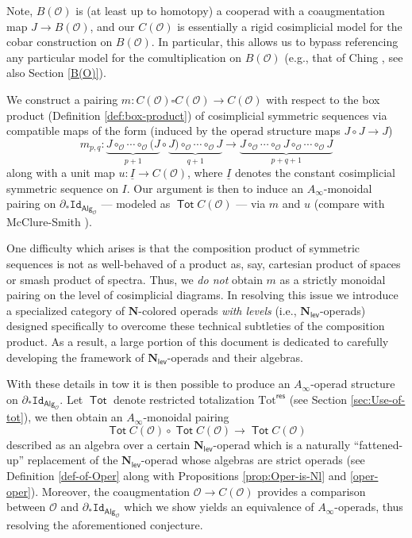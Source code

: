 \documentclass[11pt]{amsart}
\theoremstyle{definition}
\theoremstyle{remark}
\newcommand{\Tot}{\operatorname{\mathsf{Tot}}}
\newcommand{\Alg}[1]{ {\mathsf{Alg}_{\mathcal{#1}}} }
\newcommand{\Id}{\mathtt{Id}}
\newcommand{\Cal}[1]{\mathcal{#1}}
\newcommand{\Nl}{\mathbf{N}_{\mathsf{lev}}}
\begin{document}
Note, $B(\Cal{O})$ is (at least up to homotopy) a cooperad with a coaugmentation map $J\to B(\Cal{O})$, and our $C(\Cal{O})$ is essentially a rigid cosimplicial model for the cobar construction on $B(\Cal{O})$. In particular, this allows us to bypass referencing any particular model for the comultiplication on $B(\Cal{O})$ (e.g.,  that of Ching \cite{Ching-thesis}, see also Section \ref{B(O)}).  

We construct a pairing $m\colon C(\Cal{O})\square C(\Cal{O})\to C(\Cal{O})$ with respect to the box product (Definition \ref{def:box-product}) of cosimplicial symmetric sequences via compatible maps of the form (induced by the operad structure maps $J\circ J\to J$) \[ m_{p,q}\colon \underbrace{J\circ_\Cal{O} \cdots \circ_{\Cal{O}}(J}_{p+1}\circ \underbrace{J)\circ_\Cal{O} \cdots \circ_{\Cal{O}}J}_{q+1} \to \underbrace{J\circ_\Cal{O}\cdots \circ_{\Cal{O}} J\circ_{\Cal{O}} \cdots \circ_{\Cal{O}}J}_{p+q+1}\] along with a unit map $u\colon \underline{I}\to C(\Cal{O})$, where $\underline{I}$ denotes the constant cosimplicial symmetric sequence on $I$. Our argument is then to induce an $A_{\infty}$-monoidal pairing on $\partial_* \Id_{\Alg{O}}$ --- modeled as $\Tot C(\Cal{O})$ --- via $m$ and $u$ (compare with McClure-Smith \cite{MS-box}).

One difficulty which arises is that the composition product of symmetric sequences is not as well-behaved of a product as, say, cartesian product of spaces or smash product of spectra. Thus, we \textit{do not} obtain $m$ as a strictly monoidal pairing on the level of cosimplicial diagrams. In resolving this issue we introduce a specialized category of $\mathbf{N}$-colored operads \textit{with levels} (i.e., $\Nl$-operads) designed specifically to overcome these technical subtleties of the composition product. As a result, a large portion of this document is dedicated to carefully developing the framework of $\Nl$-operads and their algebras. 

With these details in tow it is then possible to produce an $A_{\infty}$-operad structure on $\partial_* \Id_{\Alg{O}}$. Let $\Tot$ denote restricted totalization $\mathrm{Tot}^{\mathsf{res}}$ (see Section \ref{sec:Use-of-tot}), we then obtain an $A_{\infty}$-monoidal pairing \[\Tot C(\Cal{O})\circ \Tot C(\Cal{O})\to \Tot C(\Cal{O})\] described as an algebra over a certain $\Nl$-operad which is a naturally ``fattened-up'' replacement of the $\Nl$-operad whose algebras are strict operads (see Definition \ref{def-of-Oper} along with Propositions \ref{prop:Oper-is-Nl} and \ref{oper-oper}). Moreover, the coaugmentation $\Cal{O}\to C(\Cal{O})$ provides a comparison between $\Cal{O}$ and $\partial_* \Id_{\Alg{O}}$ which we show yields an equivalence of $A_{\infty}$-operads, thus resolving the aforementioned conjecture. 
\end{document}
